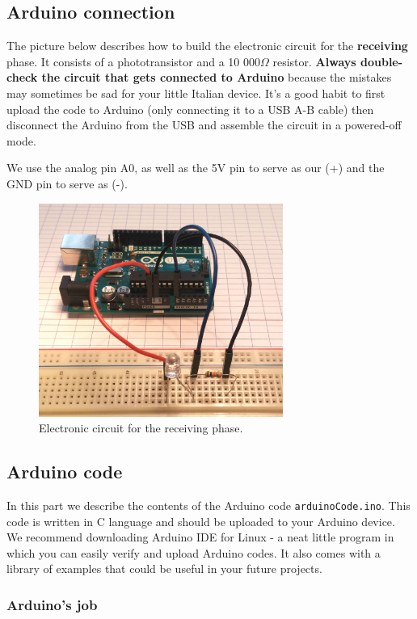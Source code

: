 \documentclass[12pt]{report}
\begin{document}
\subsection{Arduino connection}

The picture below describes how to build the electronic circuit for the \textbf{receiving} phase. It consists of a phototransistor and a 10 000$\Omega$ resistor. \textbf{Always double-check the circuit that gets connected to Arduino} because the mistakes may sometimes be sad for your little Italian device. It's a good habit to first upload the code to Arduino (only connecting it to a USB A-B cable) then disconnect the Arduino from the USB and assemble the circuit in a powered-off mode.

We use the analog pin A0, as well as the 5V pin to serve as our (+) and the GND pin to serve as (-).

\begin{figure}[H]
\centering\includegraphics[width=8cm]{receive_circuit}
\caption{Electronic circuit for the receiving phase.}				
\label{fig:receiving_circuit}
\end{figure}




\subsection{Arduino code}

In this part we describe the contents of the Arduino code \verb|arduinoCode.ino|. This code is written in C language and should be uploaded to your Arduino device. We recommend downloading Arduino IDE for Linux - a neat little program in which you can easily verify and upload Arduino codes. It also comes with a library of examples that could be useful in your future projects.

\subsubsection{Arduino's job}
\end{document}
